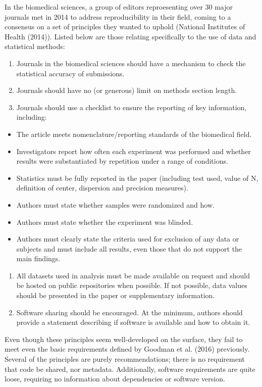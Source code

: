 \documentclass[12pt,twoside]{reedthesis}
\providecommand{\tightlist}{%
  \setlength{\itemsep}{0pt}\setlength{\parskip}{0pt}}
\begin{document}
In the biomedical sciences, a group of editors reproesenting over 30
major journals met in 2014 to address reproducibility in their field,
coming to a consensus on a set of principles they wanted to uphold
(National Institutes of Health (2014)). Listed below are those relating
specifically to the use of data and statistical methods:
\begin{enumerate}
\def\labelenumi{\arabic{enumi})}
\item
  Journals in the biomedical sciences should have a mechanism to check
  the statistical accuracy of submissions.
\item
  Journals should have no (or generous) limit on methods section length.
\item
  Journals should use a checklist to ensure the reporting of key
  information, including:
\end{enumerate}
\begin{itemize}
\tightlist
\item
  The article meets nomenclature/reporting standards of the biomedical
  field.
\item
  Investigators report how often each experiment was performed and
  whether results were substantiated by repetition under a range of
  conditions.
\item
  Statistics must be fully reported in the paper (including test used,
  value of N, definition of center, dispersion and precision measures).
\item
  Authors must state whether samples were randomized and how.
\item
  Authors must state whether the experiment was blinded.
\item
  Authors must clearly state the criteria used for exclusion of any data
  or subjects and must include all results, even those that do not
  support the main findings.
\end{itemize}
\begin{enumerate}
\def\labelenumi{\arabic{enumi})}
\setcounter{enumi}{3}
\item
  All datasets used in analysis must be made available on request and
  should be hosted on public repositories when possible. If not
  possible, data values should be presented in the paper or
  supplementary information.
\item
  Software sharing should be encouraged. At the minimum, authors should
  provide a statement describing if software is available and how to
  obtain it.
\end{enumerate}
Even though these principles seem well-developed on the surface, they
fail to meet even the basic requirements defined by Goodman et al.
(2016) previously. Several of the principles are purely recommendations;
there is no requirement that code be shared, nor metadata. Additionally,
software requirements are quite loose, requiring no information about
dependencies or software version.
\end{document}

